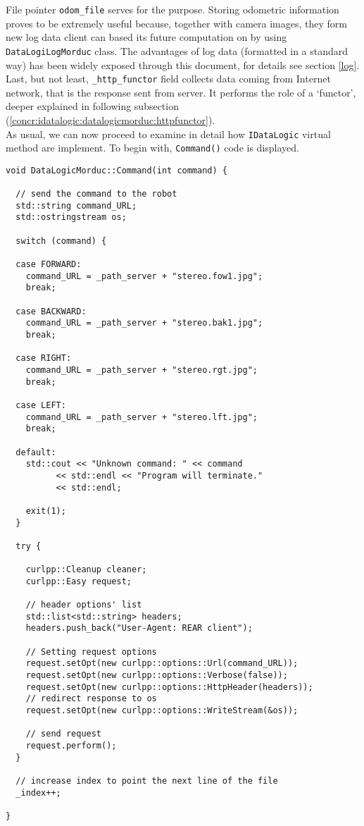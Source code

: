 File pointer \texttt{odom\_file} serves for the purpose. Storing
odometric information proves to be extremely useful because,
together with camera images, they form new log data client can
based its future computation on by using \texttt{DataLogiLogMorduc}
class. The advantages of log data (formatted in a standard way)
has been widely exposed through
this document, for details see section \ref{log}.
\\
Last, but not least, \texttt{\_http\_functor} field
collects data coming from Internet network, that is the response sent from
server. It performs the role of a `functor', deeper explained in
following subsection (\ref{concr:idatalogic:datalogicmorduc:httpfunctor}).
\\
As usual, we can now proceed to examine in detail how \texttt{IDataLogic}
virtual method are implement. To begin with, \texttt{Command()} code is
displayed.
\\
\begin{lstlisting}[caption={\texttt{DataLogicMorduc::Command() method}},
    label={code:datalogicmorduc:command}]
void DataLogicMorduc::Command(int command) {

  // send the command to the robot
  std::string command_URL;
  std::ostringstream os;

  switch (command) {

  case FORWARD:
    command_URL = _path_server + "stereo.fow1.jpg";
    break;

  case BACKWARD:
    command_URL = _path_server + "stereo.bak1.jpg";
    break;

  case RIGHT:
    command_URL = _path_server + "stereo.rgt.jpg";
    break;

  case LEFT:
    command_URL = _path_server + "stereo.lft.jpg";
    break;

  default:
    std::cout << "Unknown command: " << command
	      << std::endl << "Program will terminate."
	      << std::endl;

    exit(1);
  }
 
  try {

    curlpp::Cleanup cleaner;
    curlpp::Easy request;

    // header options' list
    std::list<std::string> headers;
    headers.push_back("User-Agent: REAR client"); 

    // Setting request options
    request.setOpt(new curlpp::options::Url(command_URL));
    request.setOpt(new curlpp::options::Verbose(false));
    request.setOpt(new curlpp::options::HttpHeader(headers));
    // redirect response to os
    request.setOpt(new curlpp::options::WriteStream(&os));    
    
    // send request
    request.perform();    
  }
       
  // increase index to point the next line of the file
  _index++;

}
\end{lstlisting}

